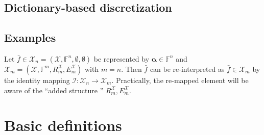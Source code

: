 \documentclass[a4paper]{paper}
\newcommand{\VecSpace}[1]{\mathscr{#1}}
\newcommand{\Field}{\mathbb{F}}
\newcommand{\Op}[1]{\mathcal{#1}}
\newcommand*{\EXT}[2]{\ensuremath{E_{#1}^{#2}}}
\newcommand*{\REST}[2]{\ensuremath{R_{#1}^{#2}}}
\newcommand*{\RmX}{\ensuremath{\REST{m}{\VecSpace{X}}}}
\newcommand*{\EmX}{\ensuremath{\EXT{m}{\VecSpace{X}}}}
\newcommand{\valpha}{\boldsymbol{\alpha}}
\begin{document}
\subsection{Dictionary-based discretization}

\subsection{Examples}

\begin{example}[Re-interpretation]
 Let $\bar f \in \VecSpace{X}_n = (\VecSpace{X}, \Field^n, \emptyset, \emptyset)$ be represented by $\valpha \in \Field^n$ and 
 $\VecSpace{X}_m = (\VecSpace{X}, \Field^m, \RmX, \EmX)$ with $m=n$. Then $\bar f$ can be re-interpreted as $\bar f \in \VecSpace{X}_m$ by 
 the identity mapping $\Op{I}: \VecSpace{X}_n \to \VecSpace{X}_m$. Practically, the re-mapped element will be aware of the ``added 
 structure '' $\RmX, \EmX$.
\end{example}





\cleardoublepage
\appendix
\section{Basic definitions}
\end{document}
